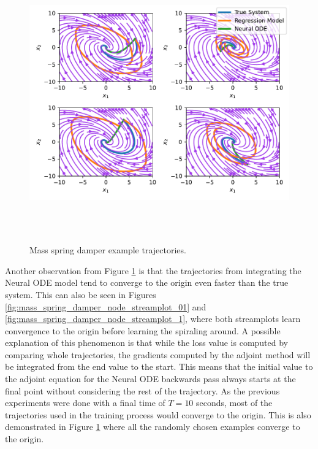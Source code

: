 \documentclass[12pt,a4paper]{book}
\begin{document}
\begin{figure}[H]
    \centering
    \includegraphics[height=12cm]{figs/plots/basic_experiments/mass_spring_damper_trajectories.pdf}
    \caption{Mass spring damper example trajectories.}
    \label{fig:mass_spring_damper_trajectories}
\end{figure}

Another observation from Figure \ref{fig:mass_spring_damper_trajectories} is that the trajectories from integrating the Neural ODE model tend to converge to the origin even faster than the true system. This can also be seen in Figures \ref{fig:mass_spring_damper_node_streamplot_01} and \ref{fig:mass_spring_damper_node_streamplot_1}, where both streamplots learn convergence to the origin before learning the spiraling around. A possible explanation of this phenomenon is that while the loss value is computed by comparing whole trajectories, the gradients computed by the adjoint method will be integrated from the end value to the start. This means that the initial value to the adjoint equation for the Neural ODE backwards pass always starts at the final point without considering the rest of the trajectory. As the previous experiments were done with a final time of $T = 10$ seconds, most of the trajectories used in the training process would converge to the origin. This is also demonstrated in Figure \ref{fig:mass_spring_damper_trajectories} where all the randomly chosen examples converge to the origin.
\end{document}
